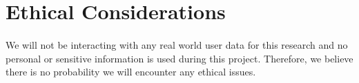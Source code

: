 \section{Ethical Considerations}
\paragraph{}
We will not be interacting with any real world user data for this research and no personal or sensitive information
is used during this project. Therefore, we believe there is no probability we will encounter any ethical
issues.